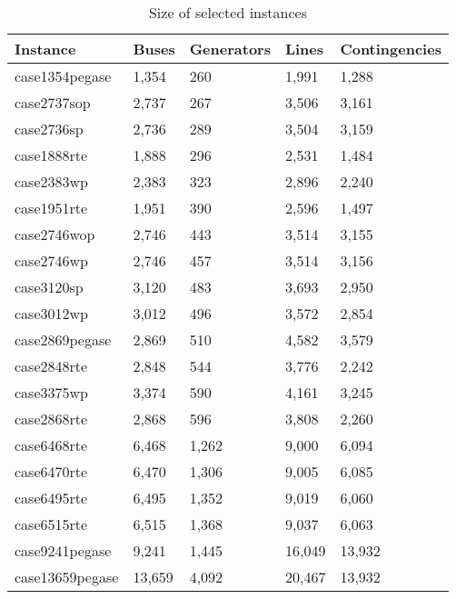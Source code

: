 \begin{table}
\caption{Size of selected instances}
\label{tab:instance_info}
\begin{tabular}{lllll}
\toprule
Instance & Buses & Generators & Lines & Contingencies \\
\midrule
case1354pegase & 1,354 & 260 & 1,991 & 1,288 \\
case2737sop & 2,737 & 267 & 3,506 & 3,161 \\
case2736sp & 2,736 & 289 & 3,504 & 3,159 \\
case1888rte & 1,888 & 296 & 2,531 & 1,484 \\
case2383wp & 2,383 & 323 & 2,896 & 2,240 \\
case1951rte & 1,951 & 390 & 2,596 & 1,497 \\
case2746wop & 2,746 & 443 & 3,514 & 3,155 \\
case2746wp & 2,746 & 457 & 3,514 & 3,156 \\
case3120sp & 3,120 & 483 & 3,693 & 2,950 \\
case3012wp & 3,012 & 496 & 3,572 & 2,854 \\
case2869pegase & 2,869 & 510 & 4,582 & 3,579 \\
case2848rte & 2,848 & 544 & 3,776 & 2,242 \\
case3375wp & 3,374 & 590 & 4,161 & 3,245 \\
case2868rte & 2,868 & 596 & 3,808 & 2,260 \\
case6468rte & 6,468 & 1,262 & 9,000 & 6,094 \\
case6470rte & 6,470 & 1,306 & 9,005 & 6,085 \\
case6495rte & 6,495 & 1,352 & 9,019 & 6,060 \\
case6515rte & 6,515 & 1,368 & 9,037 & 6,063 \\
case9241pegase & 9,241 & 1,445 & 16,049 & 13,932 \\
case13659pegase & 13,659 & 4,092 & 20,467 & 13,932 \\
\bottomrule
\end{tabular}
\end{table}
